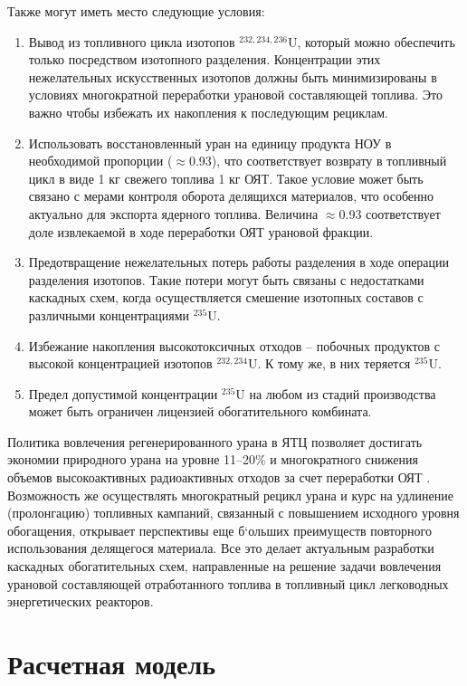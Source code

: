 Также могут иметь место следующие условия:
\begin{enumerate}
  \item Вывод из топливного цикла изотопов $^{232,234,236}$U, который можно обеспечить только посредством изотопного разделения. Концентрации этих нежелательных искусственных изотопов должны быть минимизированы в условиях многократной переработки урановой составляющей топлива. Это важно чтобы избежать их накопления к последующим рециклам.
  \item Использовать восстановленный уран на единицу продукта НОУ в необходимой пропорции ($\approx$0.93), что соответствует возврату в топливный цикл в виде 1 кг свежего топлива 1 кг ОЯТ. Такое условие может быть связано с мерами контроля оборота делящихся материалов, что особенно актуально для экспорта ядерного топлива. Величина  $\approx$0.93 соответствует доле извлекаемой в ходе переработки ОЯТ урановой фракции.
  \item Предотвращение нежелательных потерь работы разделения в ходе операции разделения изотопов. Такие потери могут быть связаны с недостатками каскадных схем, когда осуществляется смешение изотопных составов с различными концентрациями $^{235}$U. 
  \item Избежание накопления высокотоксичных отходов -- побочных продуктов с высокой концентрацией изотопов $^{232,234}$U. К тому же, в них теряется $^{235}$U.
  \item Предел допустимой концентрации $^{235}$U на любом из стадий производства может быть ограничен лицензией обогатительного комбината.
\end{enumerate}

Политика вовлечения регенерированного урана в ЯТЦ позволяет достигать экономии природного урана на уровне 11--20\% и многократного снижения объемов высокоактивных радиоактивных отходов за счет переработки ОЯТ \cite{delculAnalysisReuseUranium2009}. Возможность же осуществлять многократный рецикл урана и курс на удлинение (пролонгацию) топливных кампаний, связанный с повышением исходного уровня обогащения, открывает перспективы еще б`ольших преимуществ повторного использования делящегося материала.
Все это делает актуальным разработки каскадных обогатительных схем, направленные на решение задачи вовлечения урановой составляющей отработанного топлива в топливный цикл легководных энергетических реакторов.

\section{Расчетная модель}

